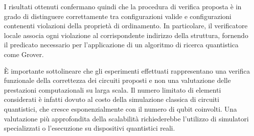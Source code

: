 I risultati ottenuti confermano quindi che la procedura di verifica proposta è in grado di distinguere correttamente tra configurazioni valide e configurazioni contenenti violazioni della proprietà di ordinamento. In particolare, il verificatore locale associa ogni violazione al corrispondente indirizzo della struttura, fornendo il predicato necessario per l'applicazione di un algoritmo di ricerca quantistica come Grover.

È importante sottolineare che gli esperimenti effettuati rappresentano una verifica funzionale della correttezza dei circuiti proposti e non una valutazione delle prestazioni computazionali su larga scala. Il numero limitato di elementi considerati è infatti dovuto al costo della simulazione classica di circuiti quantistici, che cresce esponenzialmente con il numero di qubit coinvolti. Una valutazione più approfondita della scalabilità richiederebbe l'utilizzo di simulatori specializzati o l'esecuzione su dispositivi quantistici reali.